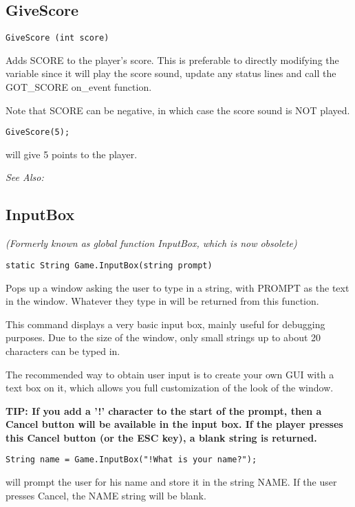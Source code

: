\subsection{GiveScore}\label{GiveScore}%

\begin{verbatim}
GiveScore (int score)
\end{verbatim}
Adds SCORE to the player's score. This is preferable to directly modifying
the variable since it will play the score sound, update any status lines
and call the GOT_SCORE on_event function.

Note that SCORE can be negative, in which case the score sound is NOT played.

\begin{verbatim}
GiveScore(5);
\end{verbatim}
will give 5 points to the player.

\it{See Also:} 


\subsection{InputBox}\label{Game.InputBox}%

\it{(Formerly known as global function InputBox, which is now obsolete)}

\begin{verbatim}
static String Game.InputBox(string prompt)
\end{verbatim}
Pops up a window asking the user to type in a string, with PROMPT as the
text in the window. Whatever they type in will be returned from this function.

This command displays a very basic input box, mainly useful for debugging
purposes. Due to the size of the window, only small strings up to about 20
characters can be typed in.

The recommended way to obtain user input is to create your own GUI with a text
box on it, which allows you full customization of the look of the window.

\bf{TIP:} If you add a '!' character to the start of the prompt, then a Cancel button will be
available in the input box. If the player presses this Cancel button (or the ESC key),
a blank string is returned.

\begin{verbatim}
String name = Game.InputBox("!What is your name?");
\end{verbatim}
will prompt the user for his name and store it in the string NAME. If the user presses Cancel,
the NAME string will be blank.

